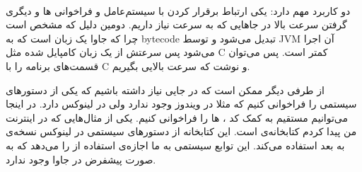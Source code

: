 \\
دو کاربرد مهم دارد:
یکی ارتباط برقرار کردن با سیستم‌عامل و فراخوانی
ها
و دیگری گرفتن سرعت بالا در جا‌هایی که به سرعت نیاز داریم.
دومین دلیل که مشخص است چرا که جاوا یک زبان است که به
bytecode
تبدیل می‌شود و توسط
JVM
آن اجرا می‌شود پس سرعتش از یک زبان کامپایل شده مثل
C
کمتر است. پس می‌توان قسمت‌های
برنامه را با
C
و
نوشت که سرعت بالایی بگیریم.

\noindent
از طرفی دیگر ممکن است که در جایی نیاز داشته باشیم که یکی از دستور‌های سیستمی را فراخوانی کنیم
که مثلا در ویندوز وجود ندارد ولی در لینوکس دارد. در اینجا می‌توانیم مستقیم به کمک کد
،
ها
را فراخوانی کنیم.
یکی از مثال‌هایی که در اینترنت من پیدا کردم کتابخانه‌ی
است. این کتابخانه از دستور‌های سیستمی
در لینوکس نسخه‌ی
به بعد استفاده می‌کند.
این توابع سیستمی به ما اجازه‌ی استفاده از
را می‌دهد که به صورت پیشفرض در جاوا وجود ندارد.